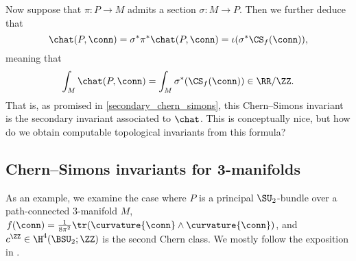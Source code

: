 Now suppose that $\pi\colon P\rightarrow M$ admits a section $\sigma\colon M\rightarrow P$. 
Then we further deduce that
\begin{equation}
	\chat(P, \conn) = \sigma^*\pi^*\chat(P, \conn) = \iota(\sigma^*\CS_f(\conn)),
\end{equation}
meaning that
\begin{equation}
\label{CS_secondary_CW}
	\int_M \chat(P, \conn) = \int_M \sigma^*(\CS_f(\conn))\in\RR/\ZZ.
\end{equation}
That is, as promised in \cref{secondary_chern_simons}, this Chern--Simons invariant is the secondary invariant
associated to $\chat$.
%
This is conceptually nice, but how do we obtain computable topological invariants from this formula?


\subsection{Chern--Simons invariants for 3-manifolds}
\label{cs_invariants}

As an example, we examine the case where $P$ is a principal $\SU_2$-bundle over a path-connected $3$-manifold $M$,
$f (\conn)=\frac{1}{8\pi^2}\tr(\curvature{\conn}\wedge \curvature{\conn})$, and $c^\ZZ\in\H^4(\BSU_2;\ZZ)$ is the
second Chern class.
We mostly follow the exposition in \cite{KK}.

